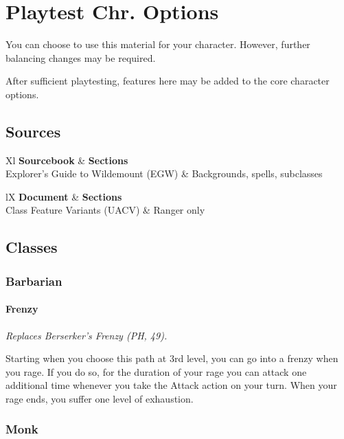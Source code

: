 \documentclass[House_Rules.tex]{subfiles}
\begin{document}
\chapter{Playtest Chr. Options}
\label{chapter4}

You can choose to use this material for your character. However, further balancing changes may be required. 

After sufficient playtesting, features here may be added to the core character options.




\section{Sources}

\begin{DndTable}[]{Xl}
    \textbf{Sourcebook} & \textbf{Sections} \\
    Explorer's Guide to Wildemount (EGW) & Backgrounds, spells, subclasses \\
\end{DndTable}

\begin{DndTable}[header=Unearthed Arcana]{lX}
    \textbf{Document} & \textbf{Sections} \\
    Class Feature Variants (UACV) & Ranger only \\
\end{DndTable}




\section{Classes}

\subsection{Barbarian}

\subsubsection{Frenzy}
\textit{Replaces Berserker's Frenzy (PH, 49).}

Starting when you choose this path at 3rd level, you can go into a frenzy when you rage. If you do so, for the duration of your rage you can attack one additional time whenever you take the Attack action on your turn. When your rage ends, you suffer one level of exhaustion.

\subsection{Monk}
\end{document}
